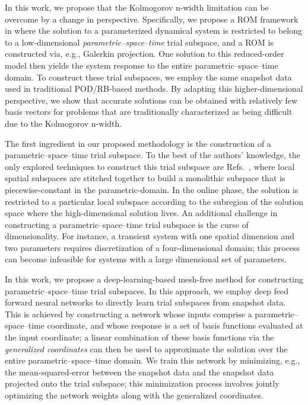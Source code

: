 \documentclass[3p,computermodern,10pt]{elsarticle}
\begin{document}
In this work, we propose that the Kolmogorov n-width limitation can be overcome by a change in perspective. Specifically, we propose a ROM framework in where the solution to a parameterized dynamical system is restricted to belong to a low-dimensional \textit{parametric--space--time} trial subspace, and a ROM is constructed via, e.g., Galerkin projection.  One solution to this reduced-order model then yields the system response to the entire parametric--space--time domain. To construct these trial subspaces, we employ the same snapshot data used in traditional POD/RB-based methods. By adapting this higher-dimensional perspective, we show that accurate solutions can be obtained with relatively few basis vectors for problems that are traditionally characterized as being difficult due to the Kolmogorov n-width. 

The first ingredient in our proposed methodology is the construction of a parametric--space--time trial subspace. To the best of the authors' knowledge, the only explored techniques to construct this trial subspace are Refs.~\cite{}, where local spatial subspaces are stitched together to build a monolithic subspace that is piecewise-constant in the parametric-domain. In the online phase, the solution is restricted to a particular local subspace according to the subregion of the solution space where the high-dimensional solution lives. An additional challenge in constructing a parametric--space--time trial subspace is the curse of dimensionality. For instance, a transient system with one spatial dimension and two parameters requires discretization of a four-dimensional domain; this process can become infeasible for systems with a large dimensional set of parameters.   

In this work, we propose a deep-learning-based mesh-free method for constructing parametric--space--time trial subspaces. In this approach, we employ deep feed forward neural networks to directly learn trial subspaces from snapshot data. This is achieved by constructing a network whose inputs comprise a parametric--space--time coordinate, and whose response is a set of basis functions evaluated at the input coordinate; a linear combination of these basis functions via the \textit{generalized coordinates} can then be used to approximate the solution over the entire parametric--space--time domain. We train this network by minimizing, e.g., the mean-squared-error between the snapshot data and the snapshot data projected onto the trial subspace; this minimization process involves jointly optimizing the network weights along with the generalized coordinates.
\end{document}
